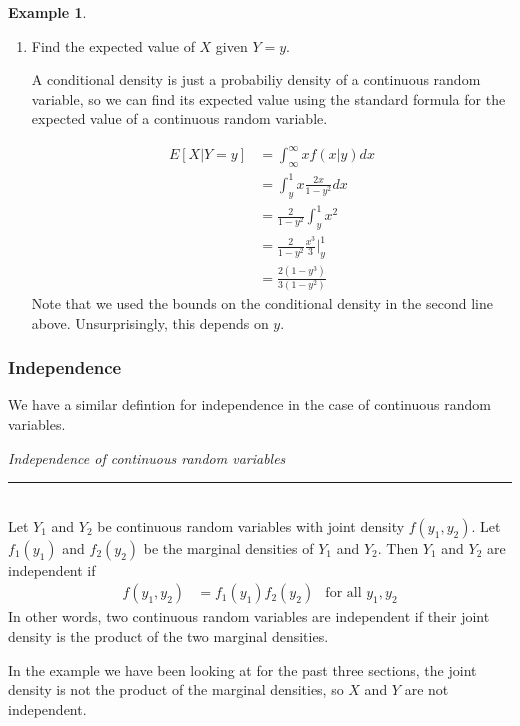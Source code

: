 \documentclass[12pt]{article}
\theoremstyle{definition}
\newtheorem*{example}{Example}
\theoremstyle{remark}
\begin{document}
\begin{example}
\begin{enumerate}
\item Find the expected value of $X$ given $Y = y$.

A conditional density is just a probabiliy density of a continuous random variable, so we can find its expected value using the standard formula for the expected value of a continuous random variable.

\begin{align*}
E[X|Y = y] &= \int_{\infty}^{\infty} xf(x|y)dx\\
&= \int_y^1 x \frac{2x}{1 - y^2} dx \\
&= \frac{2}{1 - y^2} \int_y^1 x^2 \\
&= \frac{2}{1 - y^2}\frac{x^3}{3}\Bigr|_y^1 \\
&= \frac{2(1 - y^3)}{3(1 - y^2)}
\end{align*}
Note that we used the bounds on the conditional density in the second line above. Unsurprisingly, this depends on $y$.

\end{enumerate}
\end{example}

\subsubsection{Independence}
We have a similar defintion for independence in the case of continuous random variables.\\

\begin{framed}
\emph{Independence of continuous random variables}\\
  \rule{\dimexpr{}\fboxrule}{.1pt} \\
Let $Y_1$ and $Y_2$ be continuous random variables with joint density $f(y_1, y_2)$. Let $f_1(y_1)$ and $f_2(y_2)$ be the marginal densities of $Y_1$ and $Y_2$. Then $Y_1$ and $Y_2$ are independent if
\begin{align*}
f(y_1, y_2) &= f_1(y_1)f_2(y_2) & \text{for all }y_1, y_2
\end{align*}
In other words, two continuous random variables are independent if their joint density is the product of the two marginal densities.
\end{framed}

In the example we have been looking at for the past three sections, the joint density is not the product of the marginal densities, so $X$ and $Y$ are not independent.\\
\end{document}
